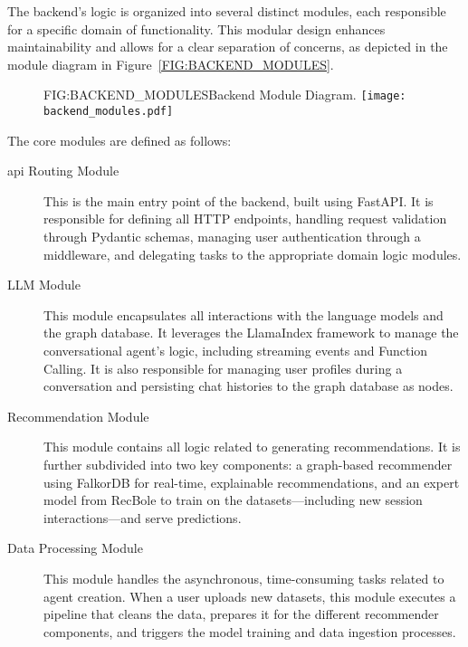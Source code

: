 The backend's logic is organized into several distinct modules, each responsible for a specific domain of functionality. This modular design enhances maintainability and allows for a clear separation of concerns, as depicted in the module diagram in Figure~\ref{FIG:BACKEND_MODULES}.

\begin{figure}[Backend Module Diagram]{FIG:BACKEND_MODULES}{Backend Module Diagram.}
    \centering
    \texttt{[image: backend\_modules.pdf]}
\end{figure}

The core modules are defined as follows:
\begin{description}
    \item[\acs{api} Routing Module] This is the main entry point of the backend, built using FastAPI. It is responsible for defining all HTTP endpoints, handling request validation through Pydantic schemas, managing user authentication through a middleware, and delegating tasks to the appropriate domain logic modules.

    \item[LLM Module] This module encapsulates all interactions with the language models and the graph database. It leverages the LlamaIndex framework to manage the conversational agent's logic, including streaming events and Function Calling. It is also responsible for managing user profiles during a conversation and persisting chat histories to the graph database as nodes.

    \item[Recommendation Module] This module contains all logic related to generating recommendations. It is further subdivided into two key components: a graph-based recommender using FalkorDB for real-time, explainable recommendations, and an expert model from RecBole to train on the datasets---including new session interactions---and serve predictions.

    \item[Data Processing Module] This module handles the asynchronous, time-consuming tasks related to agent creation. When a user uploads new datasets, this module executes a pipeline that cleans the data, prepares it for the different recommender components, and triggers the model training and data ingestion processes.
\end{description}
